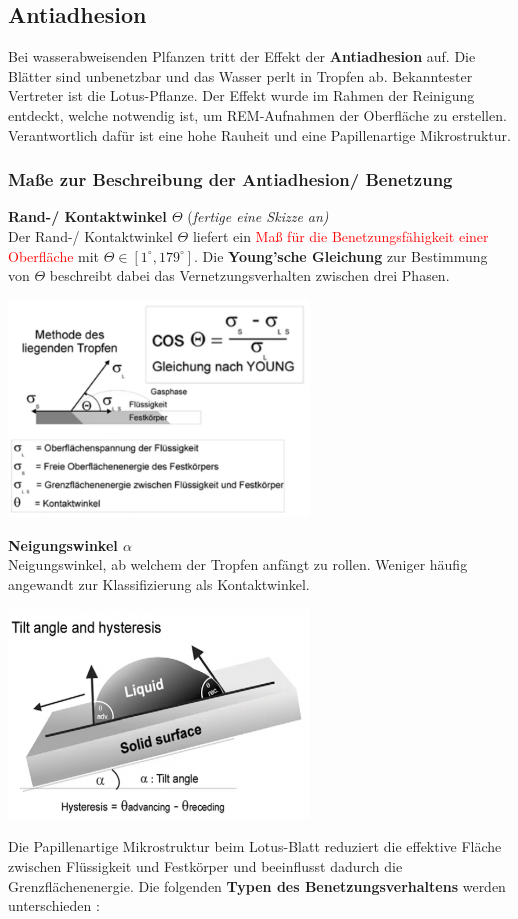 \subsection{Antiadhesion}

Bei wasserabweisenden Plfanzen tritt der Effekt der \textbf{Antiadhesion} auf. Die Blätter sind unbenetzbar und das Wasser perlt in Tropfen ab. Bekanntester Vertreter ist die Lotus-Pflanze. Der Effekt wurde im Rahmen der Reinigung entdeckt, welche notwendig ist, um REM-Aufnahmen der Oberfläche zu erstellen. Verantwortlich dafür ist eine hohe Rauheit und eine Papillenartige Mikrostruktur.

\subsubsection{Maße zur Beschreibung der Antiadhesion/ Benetzung}

\textbf{Rand-/ Kontaktwinkel $\Theta$} (\dangersign \textit{fertige eine Skizze an)}\\
Der Rand-/ Kontaktwinkel $\Theta$ liefert ein \textcolor{red}{Maß für die Benetzungsfähigkeit einer Oberfläche} mit $\Theta \in [1^\circ,179^\circ]$. Die \textbf{Young'sche Gleichung} zur Bestimmung von $\Theta$ beschreibt dabei das Vernetzungsverhalten zwischen drei Phasen.

\begin{center}
	\includegraphics[width=8cm]{lec2/figures/young.png}	
\end{center}
\textbf{Neigungswinkel $\alpha$}\\
Neigungswinkel, ab welchem der Tropfen anfängt zu rollen. Weniger häufig angewandt zur Klassifizierung als Kontaktwinkel. 

\begin{center}
	\includegraphics[width=8cm]{lec2/figures/neigungswinkel.png}	
\end{center}
Die Papillenartige Mikrostruktur beim Lotus-Blatt reduziert die effektive Fläche zwischen Flüssigkeit und Festkörper und beeinflusst dadurch die Grenzflächenenergie. Die folgenden \textbf{Typen des Benetzungsverhaltens} werden unterschieden \dangersign:

